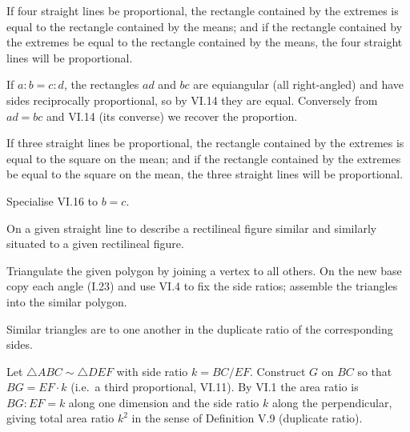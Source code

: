 \documentclass{rrxiv}
\begin{document}
\begin{claim}
\label{prop:VI.16}
If four straight lines be proportional, the rectangle contained by the
extremes is equal to the rectangle contained by the means; and if the
rectangle contained by the extremes be equal to the rectangle
contained by the means, the four straight lines will be proportional.
\end{claim}
\begin{evidence}[Proof of VI.16]
\label{ev:VI.16}
If $a : b = c : d$, the rectangles $ad$ and $bc$ are equiangular
(all right-angled) and have sides reciprocally proportional, so by
VI.14 they are equal.  Conversely from $ad = bc$ and VI.14 (its
converse) we recover the proportion.
\end{evidence}

\begin{claim}
\label{prop:VI.17}
If three straight lines be proportional, the rectangle contained by
the extremes is equal to the square on the mean; and if the rectangle
contained by the extremes be equal to the square on the mean, the
three straight lines will be proportional.
\end{claim}
\begin{evidence}[Proof of VI.17]
\label{ev:VI.17}
Specialise VI.16 to $b = c$.
\end{evidence}

\begin{claim}
\label{prop:VI.18}
On a given straight line to describe a rectilineal figure similar
and similarly situated to a given rectilineal figure.
\end{claim}
\begin{evidence}[Proof of VI.18]
\label{ev:VI.18}
Triangulate the given polygon by joining a vertex to all others.  On
the new base copy each angle (I.23) and use VI.4 to fix the side
ratios; assemble the triangles into the similar polygon.
\end{evidence}

\begin{claim}
\label{prop:VI.19}
Similar triangles are to one another in the duplicate ratio of the
corresponding sides.
\end{claim}
\begin{evidence}[Proof of VI.19]
\label{ev:VI.19}
Let $\triangle ABC \sim \triangle DEF$ with side ratio $k = BC / EF$.
Construct $G$ on $BC$ so that $BG = EF \cdot k$ (i.e.\ a third
proportional, VI.11).  By VI.1 the area ratio is $BG : EF = k$ along
one dimension and the side ratio $k$ along the perpendicular, giving
total area ratio $k^2$ in the sense of Definition V.9 (duplicate
ratio).
\end{evidence}
\end{document}
